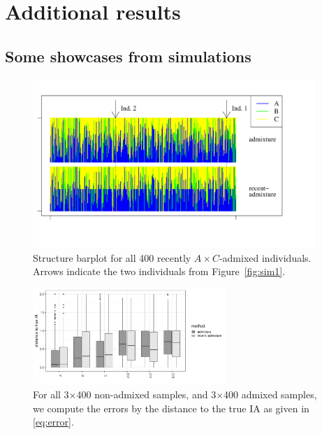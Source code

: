 \documentclass[12pt]{article}
\theoremstyle{definition}
\begin{document}
\newpage

\section{Additional results}

\subsection{Some showcases from simulations}
\enlargethispage{0cm}
\begin{figure}[H]
  \begin{center}
    \parbox[b]{0.9\textwidth}{\includegraphics[width=0.95\textwidth]{abc_StructurePlot.pdf}\vspace{-2cm}}
  \end{center}
  \caption{\label{Sfig:sim2} Structure barplot for all 400 recently
    $A\times C$-admixed individuals. Arrows indicate the two
    individuals from Figure~\ref{fig:sim1}.}
\end{figure}

\begin{figure}[H]
  \begin{center}
    \parbox[b]{0.5\textwidth}{\includegraphics[width=0.65\textwidth]{deviations_abc.pdf}\vspace{0cm}}
  \end{center}
  \caption{\label{Sfig:sim3} For all 3$\times$400 non-admixed samples,
    and 3$\times$400 admixed samples, we compute the errors by the
    distance to the true IA as given in \eqref{eq:error}.}
\end{figure}
\end{document}
